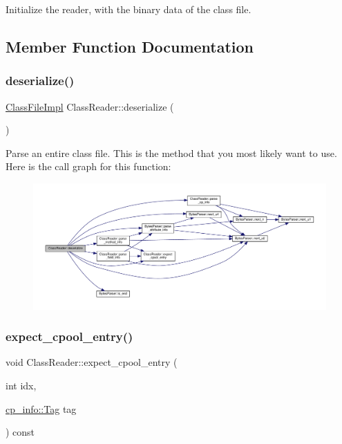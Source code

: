Initialize the reader, with the binary {\ttfamily data} of the class file. 



\subsection{Member Function Documentation}
\mbox{\label{classClassReader_a001cc48324c31430559b43976d731e8a}} 
\subsubsection{\texorpdfstring{deserialize()}{deserialize()}}
{\footnotesize\ttfamily \hyperlink{classClassFileImpl}{Class\+File\+Impl} Class\+Reader\+::deserialize (\begin{DoxyParamCaption}{ }\end{DoxyParamCaption})}

Parse an entire class file. This is the method that you most likely want to use. Here is the call graph for this function\+:
\nopagebreak
\begin{figure}[H]
\begin{center}
\leavevmode
\includegraphics[width=350pt]{classClassReader_a001cc48324c31430559b43976d731e8a_cgraph}
\end{center}
\end{figure}
\mbox{\label{classClassReader_a7f8a951758bdb961ebf36088301ac1b4}} 
\subsubsection{\texorpdfstring{expect\+\_\+cpool\+\_\+entry()}{expect\_cpool\_entry()}}
{\footnotesize\ttfamily void Class\+Reader\+::expect\+\_\+cpool\+\_\+entry (\begin{DoxyParamCaption}\item[{int}]{idx,  }\item[{\hyperlink{structcp__info_acdef8472ed83e12e3a87bca8d6001f69}{cp\+\_\+info\+::\+Tag}}]{tag }\end{DoxyParamCaption}) const\hspace{0.3cm}{\ttfamily [private]}}

